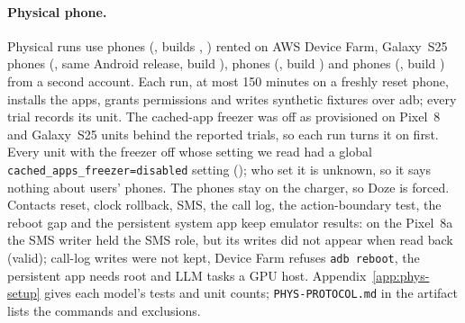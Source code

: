 \newif\ifphyssetupfirst\newcommand{\physsetupkeep}[2]{\ifphyssetupfirst#1\physsetupfirstfalse\else, #2\fi}%
\paragraph{Physical phone.}\label{sec:phys-setup} Physical runs use \PhysDevice phones (\PhysAndroid, builds \PhysFingerprint, \PhysRooted) rented on AWS Device Farm\ifPhysSamsung, Galaxy~S25 phones (\PhysSamsungModel, same Android release, build \PhysSamsungBuild)\fi\ifPhysNine, \PhysNineModel phones (\PhysNineAndroid, build \PhysNineBuild)\fi{} and \PhysEightAModel phones (\PhysEightAAndroid, build \PhysEightABuild) from a second account. Each run, at most 150 minutes on a freshly reset phone, installs the apps, grants permissions and writes synthetic fixtures over adb; every trial records its unit. The cached-app freezer was off as provisioned on \PhysFreezerOffTrialUnits Pixel~8 and \PhysSamsungFreezerOffTrialUnits Galaxy~S25 units behind the reported trials, so each run turns it on first. Every unit with the freezer off whose setting we read had a global \texttt{cached\_apps\_freezer=disabled} setting (\PhysFreezerCfgOffDisabled); who set it is unknown, so it says nothing about users' phones. The phones stay on the charger, so Doze is forced. \physsetupfirsttrue\ifPhysReset\else\physsetupkeep{Contacts reset}{Contacts reset}\fi\ifPhysClock\else\physsetupkeep{Clock rollback}{clock rollback}\fi\ifPhysSms\else\physsetupkeep{SMS}{SMS}\fi\ifPhysCalllog\else\physsetupkeep{The call log}{the call log}\fi\ifPhysBoundary\else\physsetupkeep{The action-boundary test}{the action-boundary test}\fi\ifPhysReboot\else\physsetupkeep{The reboot gap}{the reboot gap}\fi\ifphyssetupfirst The persistent system app keeps\else{} and the persistent system app keep\fi{} emulator results: on the Pixel~8a the SMS writer held the SMS role, but its writes did not appear when read back (\PhysEightASmsValid valid); call-log writes were not kept, Device Farm refuses \texttt{adb reboot}, the persistent app needs root and LLM tasks a GPU host. Appendix~\ref{app:phys-setup} gives each model's tests and unit counts; \texttt{PHYS-PROTOCOL.md} in the artifact lists the commands and exclusions.
